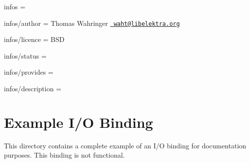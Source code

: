 
\begin{DoxyItemize}
\item infos =
\item infos/author = Thomas Wahringer \href{mailto:waht@libelektra.org}{\texttt{ waht@libelektra.\+org}}
\item infos/licence = B\+SD
\item infos/status =
\item infos/provides =
\item infos/description =
\end{DoxyItemize}\hypertarget{md_src_bindings_io_doc_README_src_bindings_io_doc_README_md}{}\section{Example I/\+O Binding}\label{md_src_bindings_io_doc_README_src_bindings_io_doc_README_md}
This directory contains a complete example of an I/O binding for documentation purposes. This binding is not functional. 